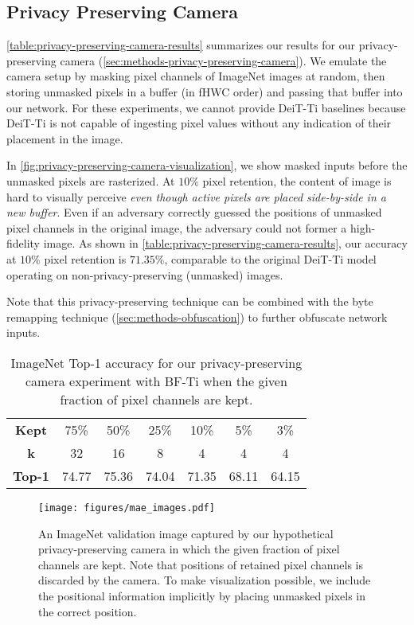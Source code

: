 \subsection{Privacy Preserving Camera} \label{sec:experiments-privacy-preserving-camera}
\autoref{table:privacy-preserving-camera-results} summarizes our results for our privacy-preserving camera (\autoref{sec:methods-privacy-preserving-camera}). We emulate the camera setup by masking pixel channels of ImageNet images at random, then storing unmasked pixels in a buffer (in fHWC order) and passing that buffer into our network. For these experiments, we cannot provide DeiT-Ti baselines because DeiT-Ti is not capable of ingesting pixel values without any indication of their placement in the image.

In \autoref{fig:privacy-preserving-camera-visualization}, we show masked inputs before the unmasked pixels are rasterized. At $10\%$ pixel retention, the content of image is hard to visually perceive \textit{even though active pixels are placed side-by-side in a new buffer}. Even if an adversary correctly guessed the positions of unmasked pixel channels in the original image, the adversary could not former a high-fidelity image. As shown in \autoref{table:privacy-preserving-camera-results}, our accuracy at $10\%$ pixel retention is $71.35\%$, comparable to the original DeiT-Ti model operating on non-privacy-preserving (unmasked) images.

Note that this privacy-preserving technique can be combined with the byte remapping technique (\autoref{sec:methods-obfuscation}) to further obfuscate network inputs.

\begin{table}
\centering
\begin{tabular}{ ccccccc }
\toprule[1.5pt]
  \textbf{Kept} & 75\% & 50\% & 25\% & 10\% & 5\% & 3\% \\
    \textbf{k} & 32 & 16 & 8 & 4 & 4 & 4 \\
  \textbf{Top-1} & 74.77 & 75.36 & 74.04 & 71.35 & 68.11 & 64.15 \\ 
  \bottomrule
\end{tabular}
\caption{
ImageNet Top-1 accuracy for our privacy-preserving camera experiment with BF-Ti when the given fraction of pixel channels are kept.
}
\label{table:privacy-preserving-camera-results}
\end{table}

\begin{figure}
    \centering
    \texttt{[image: figures/mae\_images.pdf]}
    \caption{
        An ImageNet validation image captured by our hypothetical privacy-preserving camera in which the given fraction of pixel channels are kept. Note that positions of retained pixel channels is discarded by the camera. To make visualization possible, we include the positional information implicitly by placing unmasked pixels in the correct position.
    }
    \label{fig:privacy-preserving-camera-visualization}
\end{figure}

